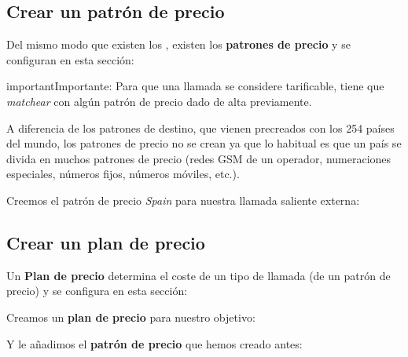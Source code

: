 \documentclass[letterpaper,10pt,spanish]{sphinxmanual}
\begin{document}
\subsection{Crear un patrón de precio}
\label{external_outgoing_calls/noplan_nocall:price-pattern}\label{external_outgoing_calls/noplan_nocall:creating-a-pricing-pattern}
Del mismo modo que existen los {\hyperref[external_outgoing_calls/call_types:target\string-patterns]{}}, existen los \textbf{patrones de precio} y se configuran en esta sección:

\noindent{}

\begin{notice}{important}{Importante:}
Para que una llamada se considere tarificable, tiene que \emph{matchear} con algún patrón de precio dado de alta previamente.
\end{notice}

A diferencia de los patrones de destino, que vienen precreados con los 254 países del mundo, los patrones de precio no se crean ya que lo habitual es que un país se divida en muchos patrones de precio (redes GSM de un operador, numeraciones especiales, números fijos, números móviles, etc.).

Creemos el patrón de precio \emph{Spain} para nuestra llamada saliente externa:

\noindent{}


\subsection{Crear un plan de precio}
\label{external_outgoing_calls/noplan_nocall:price-plan}\label{external_outgoing_calls/noplan_nocall:creating-a-pricing-plan}
Un \textbf{Plan de precio} determina el coste de un tipo de llamada (de un patrón de precio) y se configura en esta sección:

\noindent{}

Creamos un \textbf{plan de precio} para nuestro objetivo:

\noindent{}

Y le añadimos el \textbf{patrón de precio} que hemos creado antes:

\noindent{}

\noindent{}
\end{document}

